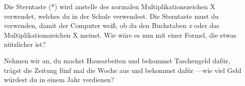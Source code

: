 Die Sterntaste (*) wird anstelle des normalen Multiplikationszeichen \textsf{X} verwendet, welches du in der Schule verwendest. Die Sterntaste must du verwenden, damit der Computer weiß, ob du den Buchstaben \emph{x} oder das Multiplikationszeichen \textsf{X} meinst. Wie wäre es nun mit einer Formel, die etwas nützlicher ist?

Nehmen wir an, du machst Hausarbeiten und bekommst  Taschengeld dafür, trägst die Zeitung fünf mal die Woche aus und bekommst dafür ---wie viel Geld würdest du in einem Jahr verdienen?

